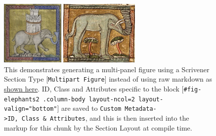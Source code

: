 \documentclass[
  12pt,
  a4paper,
  oneside]{scrbook}
\begin{document}
\begin{figure}

\begin{minipage}[b]{0.44\linewidth}

{\centering 

\includegraphics[width=1.20333in,height=\textheight]{Elephant2.jpg}

}

\end{minipage}%
%
\begin{minipage}[b]{0.56\linewidth}

{\centering 

\includegraphics[width=1.51333in,height=\textheight]{Elephant3.jpg}

}

\end{minipage}%

\caption{\label{fig-elephants2}This demonstrates generating a
multi-panel figure using a Scrivener Section Type
{[}\texttt{Multipart\ Figure}{]} instead of using raw markdown as
\protect\hyperlink{experimental-perturbations}{shown here}. ID, Class
and Attributes specific to the block
{[}\texttt{\#fig-elephants2\ .column-body\ layout-ncol=2\ layout-valign="bottom"}{]}
are saved to
\texttt{Custom\ Metadata-\textgreater{}ID,\ Class\ \&\ Attributes}, and
this is then inserted into the markup for this chunk by the Section
Layout at compile time.}

\end{figure}

\protect\hypertarget{scriv23}{}{}
\end{document}
